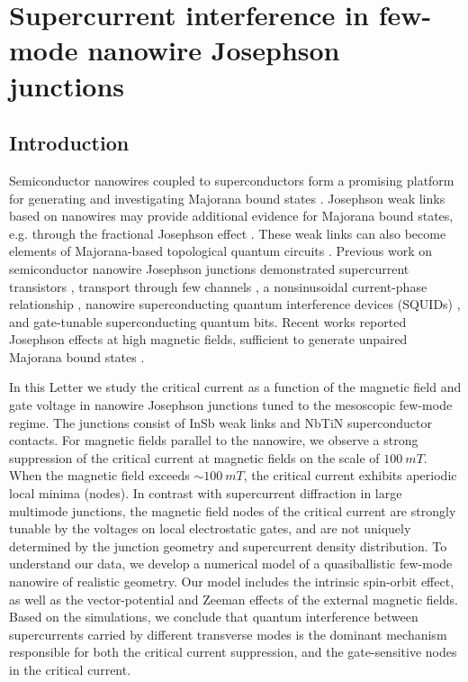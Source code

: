 \chapter{Supercurrent interference in few-mode nanowire Josephson junctions}
\label{ch:supercurrent}

\newpage
\noindent 
\section{Introduction}

Semiconductor nanowires coupled to superconductors form a promising platform for generating and investigating Majorana bound states \cite{Kitaev2001,Oreg2010,Lutchyn2010,Mourik2012,Deng2016,Albrecht2016Chen2017}. 
Josephson weak links based on nanowires may provide additional evidence for Majorana bound states, e.g. through the fractional Josephson effect \cite{Wiedenmann2015,Bocquillon2016,Deacon2017}. 
These weak links can also become elements of Majorana-based topological quantum circuits \cite{Hyart2013, Aasen2016, Karzig2017, Plugge2017}.
Previous work on semiconductor nanowire Josephson junctions demonstrated supercurrent transistors \cite{Doh2005}, transport through few channels \cite{Goffman2017}, a nonsinusoidal current-phase relationship \cite{Spanton2017}, nanowire superconducting quantum interference devices (SQUIDs) \cite{VanDam2006,Szombati2016}, and gate-tunable superconducting quantum bits\cite{Lange2015,Larsen2015}.
Recent works reported Josephson effects at high magnetic fields, sufficient to generate unpaired Majorana bound states \cite{Szombati2016,Paajaste2015,Tiira2017,Gharavi2017}.

In this Letter we study the critical current as a function of the magnetic field and gate voltage in nanowire Josephson junctions tuned to the mesoscopic few-mode regime.
The junctions consist of InSb weak links and NbTiN superconductor contacts.
For magnetic fields parallel to the nanowire, we observe a strong suppression of the critical current at magnetic fields on the scale of $\SI{100}{mT}$. 
When the magnetic field exceeds $\sim \SI{100}{mT}$, the critical current exhibits aperiodic local minima (nodes). 
In contrast with supercurrent diffraction in large multimode junctions, the magnetic field nodes of the critical current are strongly tunable by the voltages on local electrostatic gates, and are not uniquely determined by the junction geometry and supercurrent density distribution. 
To understand our data, we develop a numerical model of a quasiballistic few-mode nanowire of realistic geometry.
Our model includes the intrinsic spin-orbit effect, as well as the vector-potential and Zeeman effects of the external magnetic fields. 
Based on the simulations, we conclude that quantum interference between supercurrents carried by different transverse modes is the dominant mechanism responsible for both the critical current suppression, and the gate-sensitive nodes in the critical current.

